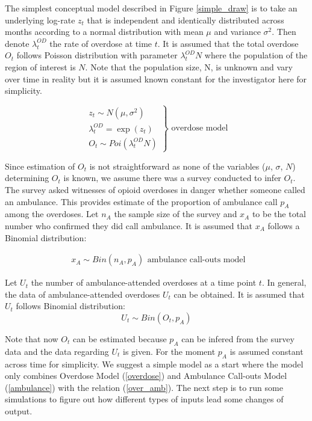 \documentclass[]{article}
\begin{document}
 The simplest conceptual model described in Figure \ref{simple_draw} is to take an underlying log-rate $z_t$ that is independent and identically distributed across months according to a normal distribution with mean $\mu$ and variance $\sigma^2$. \cite{Irvine:modelling} Then denote $\lambda_{t}^{OD}$ the rate of overdose at time $t$. It is assumed that the total overdose $O_t$ follows Poisson distribution with parameter $\lambda_{t}^{OD}N$ where the population of the region of interest is $N$. Note that the population size, N, is unknown and vary over time in reality but it is assumed known constant for the investigator here for simplicity. 
 
 \begin{equation}
 \label{overdose}
 \left.\begin{aligned}
 z_{t} \sim N(\mu, \sigma^{2}) \\
 \lambda_{t}^{OD} = \exp(z_{t})\\
 O_{t} \sim Poi(\lambda_{t}^{OD}N) 
 \end{aligned}\right\} 
 \text{		overdose model} 
 \end{equation}
 
Since estimation of $O_t$ is not straightforward as none of the variables ($\mu$, $\sigma$, $N$) determining $O_t$  is known, we assume there was a survey conducted to infer $O_t$. The survey asked witnesses of opioid overdoses in danger whether someone called an ambulance. This provides estimate of the proportion of ambulance call $p_A$ among the overdoses. Let $n_{A}$ the sample size of the survey and $x_{A}$ to be the total number who confirmed they did call ambulance. It is assumed that $x_{A}$ follows a Binomial distribution:

\begin{equation}
\label{ambulance}
\left.\begin{aligned}
x_{A} \sim Bin(n_{A},p_{A})\end{aligned}\right.
\text{ambulance call-outs model}
\end{equation}

Let \(U_t\) the number of  ambulance-attended overdoses at a time point $t$. In general, the data of ambulance-attended overdoses \(U_t\) can be obtained. It is assumed that  \(U_t\) follows Binomial distribution: 
\begin{equation}
\label{over_amb}
\left.
U_t \sim Bin(O_t, p_A)
\right.
\end{equation}

Note that now $O_t$ can be estimated because $p_A$ can be infered from the survey data and the data regarding $U_t$ is given.  For the moment $p_A$ is assumed constant across time for simplicity. We suggest a simple model as a start where the model only combines Overdose Model (\ref{overdose}) and Ambulance Call-outs Model (\ref{ambulance}) with the relation (\ref{over_amb}). The next step is to run some simulations to figure out how different types of inputs lead some changes of output. \\
\end{document}
